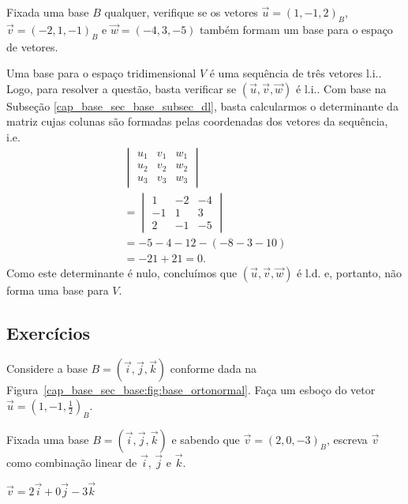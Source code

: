 \begin{exeresol}
  Fixada uma base $B$ qualquer, verifique se os vetores $\vec{u}=(1,-1,2)_B$, $\vec{v}=(-2,1,-1)_B$ e $\vec{w}=(-4,3,-5)$ também formam um base para o espaço de vetores.
\end{exeresol}
\begin{resol}
  Uma base para o espaço tridimensional $V$ é uma sequência de três vetores l.i.. Logo, para resolver a questão, basta verificar se $(\vec{u},\vec{v},\vec{w})$ é l.i.. Com base na Subseção \ref{cap_base_sec_base_subsec_dl}, basta calcularmos o determinante da matriz cujas colunas são formadas pelas coordenadas dos vetores da sequência, i.e.
  \begin{gather}
    \begin{vmatrix}
      u_1 & v_1 & w_1 \\
      u_2 & v_2 & w_2 \\
      u_3 & v_3 & w_3
    \end{vmatrix}\\
    = \begin{vmatrix}
      1 & -2 & -4 \\
      -1 & 1 & 3 \\
      2 & -1 & -5
    \end{vmatrix}\\
    = -5-4-12-(-8-3-10)\\
    = -21+21 = 0.
  \end{gather}
  Como este determinante é nulo, concluímos que $(\vec{u},\vec{v},\vec{w})$ é l.d. e, portanto, não forma uma base para $V$.
\end{resol}

\subsection{Exercícios}

\begin{exer}
  Considere a base $B=(\vec{i}, \vec{j}, \vec{k})$ conforme dada na Figura~\ref{cap_base_sec_base:fig:base_ortonormal}. Faça um esboço do vetor $\vec{u}=\left(1,-1,\frac{1}{2}\right)_B$.  
\end{exer}

\begin{exer}
  Fixada uma base $B=(\vec{i},\vec{j},\vec{k})$ e sabendo que $\vec{v}=(2, 0, -3)_B$, escreva $\vec{v}$ como combinação linear de $\vec{i}$, $\vec{j}$ e $\vec{k}$.
\end{exer}
\begin{resp}
  $\vec{v}=2\vec{i}+0\vec{j}-3\vec{k}$
\end{resp}

